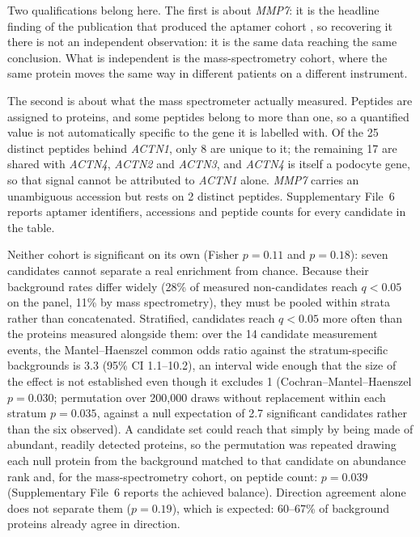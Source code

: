 \documentclass[11pt]{article}
\begin{document}
Two qualifications belong here. The first is about \textit{MMP7}: it is the headline finding
of the publication that produced the aptamer cohort \cite{hirohama2023}, so recovering it there
is not an independent observation: it is the same data reaching the same conclusion. What is
independent is the mass-spectrometry cohort, where the same protein moves the same way in
different patients on a different instrument.

The second is about what the mass spectrometer actually measured. Peptides are assigned to
proteins, and some peptides belong to more than one, so a quantified value is not automatically
specific to the gene it is labelled with. Of the 25 distinct peptides behind \textit{ACTN1},
only 8 are unique to it; the remaining 17 are shared with \textit{ACTN4}, \textit{ACTN2} and
\textit{ACTN3}, and \textit{ACTN4} is itself a podocyte gene, so that signal cannot be attributed to
\textit{ACTN1} alone. \textit{MMP7} carries an unambiguous accession but rests on 2 distinct
peptides. Supplementary File~6 reports aptamer identifiers, accessions and peptide counts for
every candidate in the table.

Neither cohort is significant on its own (Fisher $p = 0.11$ and $p = 0.18$): seven candidates
cannot separate a real enrichment from chance. Because their background rates differ widely
(28\% of measured non-candidates reach $q < 0.05$ on the panel, 11\% by mass spectrometry), they
must be pooled within strata rather than concatenated. Stratified, candidates reach $q < 0.05$
more often than the proteins measured alongside them: over the 14 candidate measurement
events, the Mantel--Haenszel common odds ratio against the stratum-specific backgrounds
is 3.3 (95\% CI 1.1--10.2), an interval wide enough that the size of the effect is not
established even though it excludes 1 (Cochran--Mantel--Haenszel \cite{mantel1959} $p = 0.030$;
permutation over 200,000 draws without replacement within each stratum $p = 0.035$,
against a null expectation of 2.7 significant candidates rather than the six observed). A
candidate set could reach that simply by being made of abundant, readily detected proteins, so
the permutation was repeated drawing each null protein from the background matched to that
candidate on abundance rank and, for the mass-spectrometry cohort, on peptide count: $p = 0.039$
(Supplementary File~6 reports the achieved balance). Direction agreement alone does not separate them
($p = 0.19$), which is expected: 60--67\% of background proteins already agree in direction.
\end{document}
